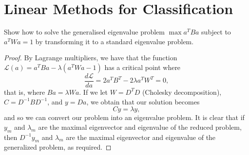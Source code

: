 \chapter{Linear Methods for Classification}

\begin{exer}
    Show how to solve the generalised eigenvalue problem $\max a^T B a$ subject to $a^T W a = 1$ by transforming it to a standard eigenvalue problem.
\end{exer}

\begin{proof}
    By Lagrange multipliers, we have that the function $\mathcal{L}(a) = a^T B a - \lambda(a^T W a - 1)$ has a critical point where \[
        \frac{d \mathcal{L}}{da} = 2 a^T B^T - 2 \lambda a^T W^T = 0,
        \] that is, where $Ba = \lambda Wa$.  If we let $W = D^T D$ (Cholesky decomposition), $C = D^{-1} B D^{-1}$, and $y = Da$, we obtain that our solution becomes \[
            Cy = \lambda y,
            \] and so we can convert our problem into an eigenvalue problem.  It is clear that if $y_m$ and $\lambda_m$ are the maximal eigenvector and eigenvalue of the reduced problem, then $D^{-1} y_m$ and $\lambda_m$ are the maximal eigenvector and eigenvalue of the generalized problem, as required.
\end{proof}


